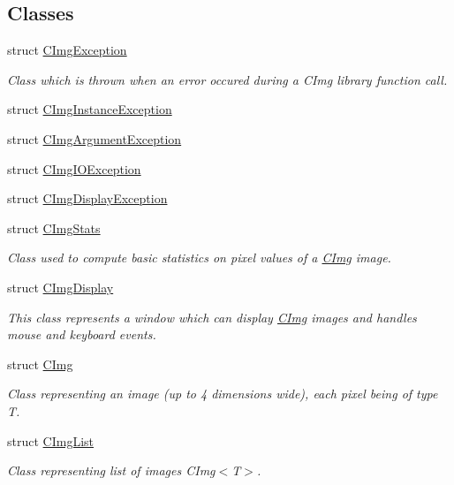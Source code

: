 \subsection*{Classes}
\begin{DoxyCompactItemize}
\item 
struct \hyperlink{structcimg__library_1_1_c_img_exception}{CImgException}
\begin{DoxyCompactList}\small\item\em Class which is thrown when an error occured during a CImg library function call. \item\end{DoxyCompactList}\item 
struct \hyperlink{structcimg__library_1_1_c_img_instance_exception}{CImgInstanceException}
\item 
struct \hyperlink{structcimg__library_1_1_c_img_argument_exception}{CImgArgumentException}
\item 
struct \hyperlink{structcimg__library_1_1_c_img_i_o_exception}{CImgIOException}
\item 
struct \hyperlink{structcimg__library_1_1_c_img_display_exception}{CImgDisplayException}
\item 
struct \hyperlink{structcimg__library_1_1_c_img_stats}{CImgStats}
\begin{DoxyCompactList}\small\item\em Class used to compute basic statistics on pixel values of a \hyperlink{structcimg__library_1_1_c_img}{CImg} image. \item\end{DoxyCompactList}\item 
struct \hyperlink{structcimg__library_1_1_c_img_display}{CImgDisplay}
\begin{DoxyCompactList}\small\item\em This class represents a window which can display \hyperlink{structcimg__library_1_1_c_img}{CImg} images and handles mouse and keyboard events. \item\end{DoxyCompactList}\item 
struct \hyperlink{structcimg__library_1_1_c_img}{CImg}
\begin{DoxyCompactList}\small\item\em Class representing an image (up to 4 dimensions wide), each pixel being of type {\ttfamily T}. \item\end{DoxyCompactList}\item 
struct \hyperlink{structcimg__library_1_1_c_img_list}{CImgList}
\begin{DoxyCompactList}\small\item\em Class representing list of images CImg$<$T$>$. \item\end{DoxyCompactList}\end{DoxyCompactItemize}
